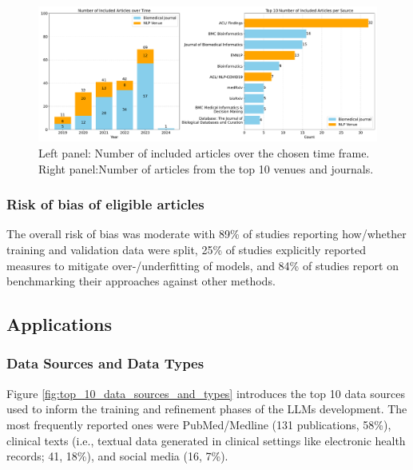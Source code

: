 \documentclass[fleqn,10pt]{olplainarticle}
\begin{document}


\begin{figure}[!ht]
\begin{center}
\includegraphics[scale=0.3]{visuals/new_pdf/overview_years_and_journal_count_2024.pdf} %
\caption{Left panel: Number of included articles over the chosen time frame. Right panel:Number of articles from the top 10 venues and journals.}
\label{fig:top_10_journals_venues_and_time_distribution}
\end{center}
\end{figure}

\subsubsection*{Risk of bias of eligible articles}
The overall risk of bias was moderate with 89\% of studies reporting how/whether training and validation data were split, 25\% of studies explicitly reported measures to mitigate over-/underfitting of models, and 84\% of studies report on benchmarking their approaches against other methods. %


\subsection*{Applications}

\subsubsection*{Data Sources and Data Types}
Figure \ref{fig:top_10_data_sources_and_types} introduces the top 10 data sources used to inform the training and refinement phases of the LLMs development. The most frequently reported ones were PubMed/Medline (131 publications, 58\%), clinical texts (i.e., textual data generated in clinical settings like electronic health records; 41, 18\%), and social media (16, 7\%).
\end{document}
